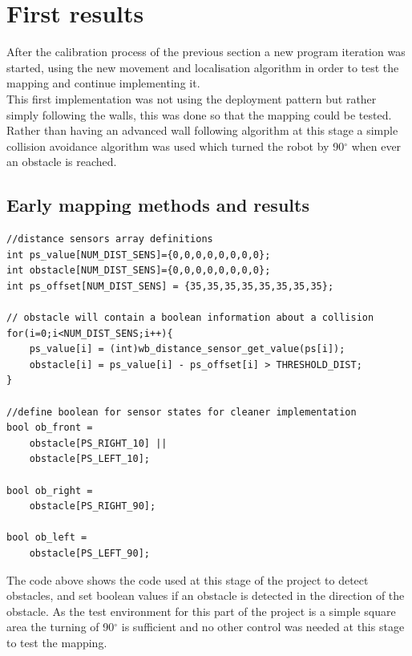 \section{First results}
After the calibration process of the previous section a new program iteration was started, using the new movement and localisation algorithm in order to test the mapping and continue implementing it. \\[3ex]

This first implementation was not using the deployment pattern but rather simply following the walls, this was done so that the mapping could be tested. Rather than having an advanced wall following algorithm at this stage a simple collision avoidance algorithm was used which turned the robot by 90$^\circ$ when ever an obstacle is reached. 

\subsection{Early mapping methods and results}

\begin{lstlisting}[caption={Proximity sensor reading}]
//distance sensors array definitions
int ps_value[NUM_DIST_SENS]={0,0,0,0,0,0,0,0};
int obstacle[NUM_DIST_SENS]={0,0,0,0,0,0,0,0};
int ps_offset[NUM_DIST_SENS] = {35,35,35,35,35,35,35,35};

// obstacle will contain a boolean information about a collision
for(i=0;i<NUM_DIST_SENS;i++){
	ps_value[i] = (int)wb_distance_sensor_get_value(ps[i]);
	obstacle[i] = ps_value[i] - ps_offset[i] > THRESHOLD_DIST;
}

//define boolean for sensor states for cleaner implementation
bool ob_front =
	obstacle[PS_RIGHT_10] ||
	obstacle[PS_LEFT_10];

bool ob_right =
	obstacle[PS_RIGHT_90];

bool ob_left =
	obstacle[PS_LEFT_90];
\end{lstlisting}

The code above shows the code used at this stage of the project to detect obstacles, and set boolean values if an obstacle is detected in the direction of the  obstacle. As the test environment for this part of the project is a simple square area the turning of 90$^{\circ}$ is sufficient and no other control was needed at this stage to test the mapping. 

